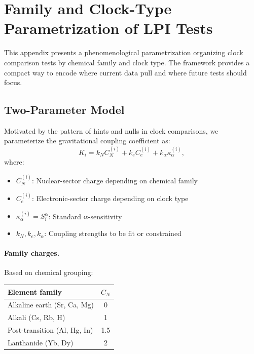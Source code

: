 
\section{Family and Clock-Type Parametrization of LPI Tests}\label{app:family-clock}

This appendix presents a phenomenological parametrization organizing 
clock comparison tests by chemical family and clock type. The framework 
provides a compact way to encode where current data pull and where 
future tests should focus.

\subsection{Two-Parameter Model}\label{app:fc-model}

Motivated by the pattern of hints and nulls in clock comparisons, we 
parameterize the gravitational coupling coefficient as:
\begin{equation}\label{eq:K-family-clock}
K_i = k_N C_N^{(i)} + k_e C_e^{(i)} + k_\alpha \kappa_\alpha^{(i)},
\end{equation}
where:
\begin{itemize}
\item $C_N^{(i)}$: Nuclear-sector charge depending on chemical family
\item $C_e^{(i)}$: Electronic-sector charge depending on clock type
\item $\kappa_\alpha^{(i)} = S_i^\alpha$: Standard $\alpha$-sensitivity
\item $k_N, k_e, k_\alpha$: Coupling strengths to be fit or constrained
\end{itemize}

\paragraph{Family charges.}
Based on chemical grouping:
\begin{center}
\begin{tabular}{lc}
\toprule
\textbf{Element family} & $C_N$ \\
\midrule
Alkaline earth (Sr, Ca, Mg) & 0 \\
Alkali (Cs, Rb, H) & 1 \\
Post-transition (Al, Hg, In) & 1.5 \\
Lanthanide (Yb, Dy) & 2 \\
\bottomrule
\end{tabular}
\end{center}

